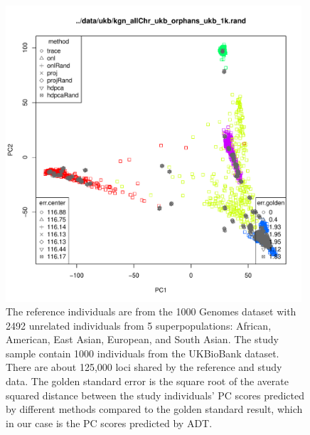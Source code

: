 \documentclass{article}
\begin{document}
\begin{figure}[p]
  \centering
  \includegraphics[width=0.98\textwidth]{ukb}
  \caption{
    The reference individuals are from the 1000 Genomes dataset with 2492 unrelated individuals from 5 superpopulations: African, American, East Asian, European, and South Asian. 
    The study sample contain 1000 individuals from the UKBioBank dataset.
    There are about 125,000 loci shared by the reference and study data.
    The golden standard error is the square root of the averate squared distance between the study individuals' PC scores predicted by different methods compared to the golden standard result, which in our case is the PC scores predicted by ADT.
  }
  \label{fig:ukb}
\end{figure}
\end{document}
